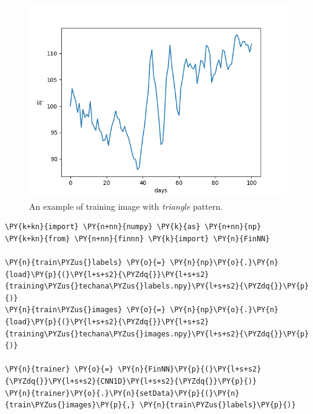 \begin{figure}
	\centering
	\includegraphics[width=0.5\linewidth]{figures/image_0.png}
	\caption{An example of training image with \emph{triangle} pattern.}
\end{figure}

\begin{tcolorbox}[breakable, size=fbox, boxrule=1pt, pad at break*=1mm,colback=cellbackground, colframe=cellborder]
\begin{Verbatim}[commandchars=\\\{\}]
\PY{k+kn}{import} \PY{n+nn}{numpy} \PY{k}{as} \PY{n+nn}{np}
\PY{k+kn}{from} \PY{n+nn}{finnn} \PY{k}{import} \PY{n}{FinNN}
	
\PY{n}{train\PYZus{}labels} \PY{o}{=} \PY{n}{np}\PY{o}{.}\PY{n}{load}\PY{p}{(}\PY{l+s+s2}{\PYZdq{}}\PY{l+s+s2}{training\PYZus{}techana\PYZus{}labels.npy}\PY{l+s+s2}{\PYZdq{}}\PY{p}{)}
\PY{n}{train\PYZus{}images} \PY{o}{=} \PY{n}{np}\PY{o}{.}\PY{n}{load}\PY{p}{(}\PY{l+s+s2}{\PYZdq{}}\PY{l+s+s2}{training\PYZus{}techana\PYZus{}images.npy}\PY{l+s+s2}{\PYZdq{}}\PY{p}{)}
	
\PY{n}{trainer} \PY{o}{=} \PY{n}{FinNN}\PY{p}{(}\PY{l+s+s2}{\PYZdq{}}\PY{l+s+s2}{CNN1D}\PY{l+s+s2}{\PYZdq{}}\PY{p}{)}
\PY{n}{trainer}\PY{o}{.}\PY{n}{setData}\PY{p}{(}\PY{n}{train\PYZus{}images}\PY{p}{,} \PY{n}{train\PYZus{}labels}\PY{p}{)}
	

\end{Verbatim}
\end{tcolorbox}
